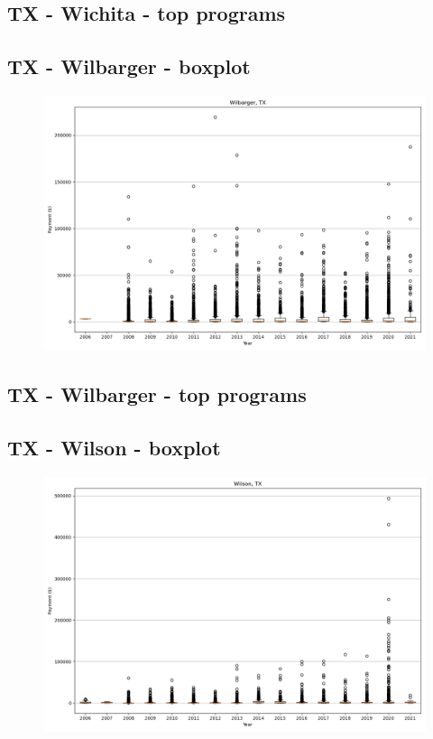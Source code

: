 \subsection*{TX - Wichita - top programs}

\newpage
\subsection*{TX - Wilbarger - boxplot}
\begin{figure}[h]
\centering
\includegraphics[width=7in]{../output/boxplots/counties/Wilbarger-TX_boxplot.png}
\end{figure}


\subsection*{TX - Wilbarger - top programs}

\newpage
\subsection*{TX - Wilson - boxplot}
\begin{figure}[h]
\centering
\includegraphics[width=7in]{../output/boxplots/counties/Wilson-TX_boxplot.png}
\end{figure}


